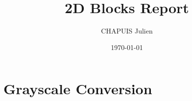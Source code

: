 \documentclass{article}
\title{2D Blocks Report}
\author{CHAPUIS Julien}
\date{\today}
\begin{document}
\section{Grayscale Conversion}
\end{document}

